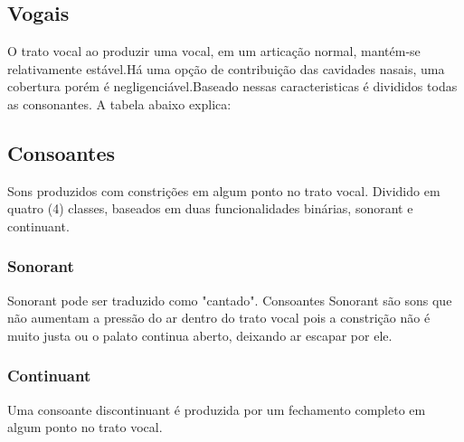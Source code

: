 	\subsection{Vogais}
	
	O trato vocal ao produzir uma vocal, em um articação normal, mantém-se relativamente estável.Há uma opção de contribuição das cavidades nasais, uma cobertura porém é negligenciável.Baseado nessas caracteristicas é divididos todas as consonantes. A tabela abaixo explica:
	
	
	\subsection{Consoantes}
	Sons produzidos com constrições em algum ponto no trato vocal. Dividido em quatro (4) classes, baseados em duas funcionalidades binárias, sonorant e continuant.
	
	
		\subsubsection{Sonorant}	 
			Sonorant pode ser traduzido como "cantado". Consoantes Sonorant são sons que não aumentam a pressão do ar dentro do trato vocal pois a constrição não é muito justa ou o palato continua aberto, deixando ar escapar por ele.
			
		\subsubsection{Continuant}
			Uma consoante discontinuant é produzida por um fechamento completo em algum ponto no trato vocal.

